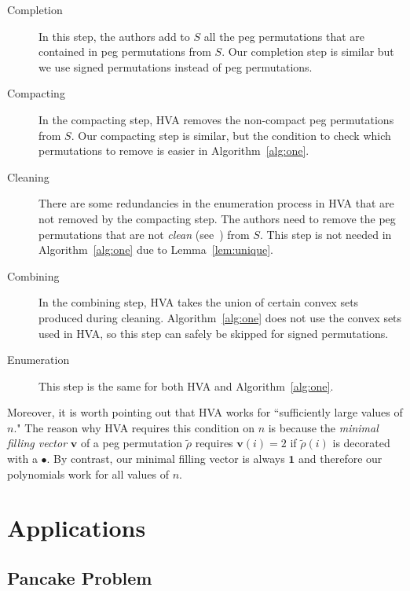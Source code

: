 \documentclass{article}
\numberwithin{equation}{section}
\theoremstyle{definition}
\newcommand{\V}{\textbf{v}}
\begin{document}
\begin{description} 
\item[Completion] In this step, the authors add to $S$ all the peg permutations that are contained in peg permutations from $S$. Our completion step is similar but we use signed permutations instead of peg permutations.
\item[Compacting] In the compacting step, HVA removes the non-compact peg permutations from $S$. Our compacting step is similar, but the condition to check which permutations to remove is easier in Algorithm~\ref{alg:one}.
\item[Cleaning] There are some redundancies in the enumeration process in HVA that are not removed by the compacting step. The authors need to remove the peg permutations that are not \emph{clean} (see~\cite[Section 2.3]{HV16}) from $S$. This step is not needed in Algorithm~\ref{alg:one} due to Lemma~\ref{lem:unique}.
\item[Combining] In the combining step, HVA  takes the union of certain convex sets produced during cleaning. Algorithm~\ref{alg:one} does not use the convex sets used in HVA, so this step can safely be skipped for signed permutations. 
\item[Enumeration] This step is the same for both HVA and Algorithm~\ref{alg:one}.
\end{description}

Moreover, it is worth pointing out that HVA works for ``sufficiently large values of $n$." The reason why HVA requires this condition on $n$ is because the \emph{minimal filling vector} $\V$ of a peg permutation $\tilde{\rho}$ requires $\V(i)=2$ if $\tilde{\rho}(i)$ is decorated with a $\bullet$. By contrast, our minimal filling vector is always $\mathbf{1}$ and therefore our polynomials work for all values of $n$.



\section{Applications}\label{sec:applications}


\subsection{Pancake Problem}
\end{document}
